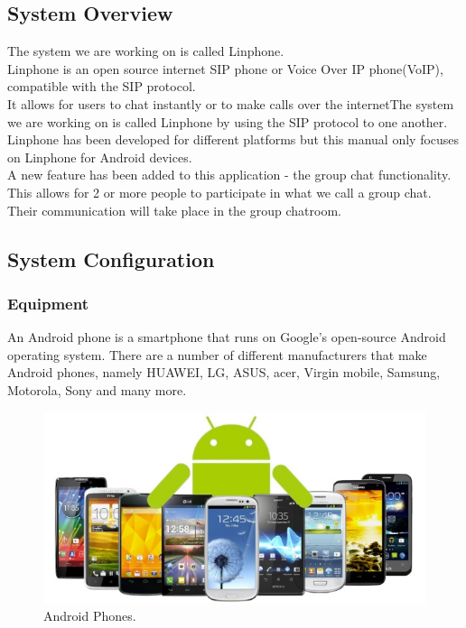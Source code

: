 \documentclass[a4paper]{article}
\begin{document}
\subsection{System Overview}
The system we are working on is called Linphone.\\
Linphone is an open source internet SIP phone or Voice Over IP phone(VoIP), compatible with the SIP protocol.  \\
It allows for users to chat instantly or to make calls over the internetThe system we are working on is called Linphone by using the SIP protocol to one another. \\
Linphone has been developed for different platforms but this manual only focuses on Linphone for Android devices.\\
A new feature has been added to this application - the group chat functionality. This allows for 2 or more people to participate in what we call a group chat. Their communication will take place in the group chatroom.

\subsection{System Configuration}

\subsubsection{Equipment}
An Android phone is a smartphone that runs on Google's open-source Android operating system. There are a number of different manufacturers that make Android phones, namely HUAWEI, LG, ASUS, acer, Virgin mobile, Samsung, Motorola, Sony and many more.\\

\begin{center}
\begin{figure}[h]
\centering
\includegraphics[width=0.7\linewidth]{./pictures/android.jpg}
\caption{\label{fig:Agile}Android Phones.}
\end{figure}
\end{center}
\end{document}
